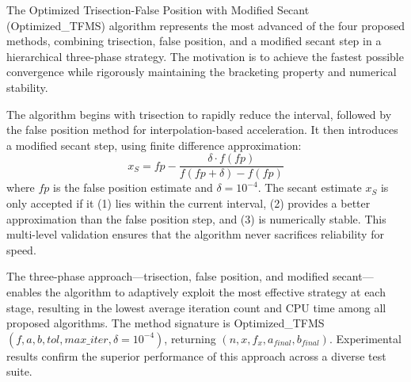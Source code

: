 \documentclass[amsmath, amssymb, aps]{revtex4-2}
\begin{document}
The Optimized Trisection-False Position with Modified Secant (Optimized\_TFMS) algorithm represents the most advanced of the four proposed methods, combining trisection, false position, and a modified secant step in a hierarchical three-phase strategy. The motivation is to achieve the fastest possible convergence while rigorously maintaining the bracketing property and numerical stability.

The algorithm begins with trisection to rapidly reduce the interval, followed by the false position method for interpolation-based acceleration. It then introduces a modified secant step, using finite difference approximation:
\begin{equation}
x_S = fp - \frac{\delta \cdot f(fp)}{f(fp + \delta) - f(fp)}
\end{equation}
where $fp$ is the false position estimate and $\delta = 10^{-4}$. The secant estimate $x_S$ is only accepted if it (1) lies within the current interval, (2) provides a better approximation than the false position step, and (3) is numerically stable. This multi-level validation ensures that the algorithm never sacrifices reliability for speed.

The three-phase approach—trisection, false position, and modified secant—enables the algorithm to adaptively exploit the most effective strategy at each stage, resulting in the lowest average iteration count and CPU time among all proposed algorithms. The method signature is Optimized\_TFMS$(f, a, b, tol, max\_iter, \delta = 10^{-4})$, returning $(n, x, f_x, a_{final}, b_{final})$. Experimental results confirm the superior performance of this approach across a diverse test suite.
\end{document}
